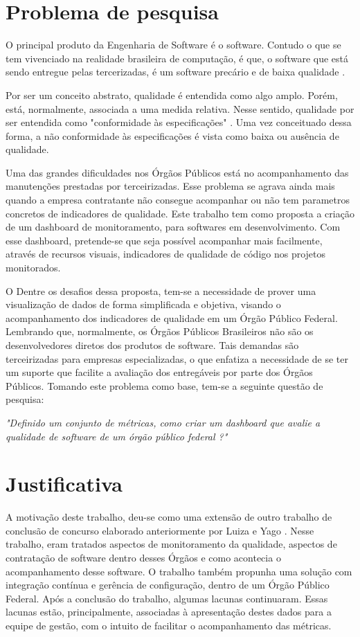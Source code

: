 \section{Problema de pesquisa}
O principal produto da Engenharia de Software é o software. Contudo o que se tem vivenciado na realidade brasileira de computação, é que, o software que está sendo entregue pelas tercerizadas, é um software precário e de baixa qualidade \cite{schnaider_uma_2004}.

 Por ser um conceito abstrato, qualidade é entendida como algo amplo. Porém, está, normalmente, associada a uma medida relativa. Nesse sentido, qualidade por ser entendida como "conformidade às especificações" \cite{crosby}. Uma vez conceituado dessa forma, a não conformidade às especificações é vista como baixa ou ausência de qualidade.

 Uma das grandes dificuldades nos Órgãos Públicos está no acompanhamento das manutenções prestadas por terceirizadas. Esse problema se agrava ainda mais quando a empresa contratante não consegue acompanhar ou não tem parametros concretos de indicadores de qualidade. 
Este trabalho tem como proposta a criação de um dashboard de monitoramento, para softwares em desenvolvimento. Com esse dashboard, pretende-se que seja possível acompanhar mais facilmente, através de recursos visuais, indicadores de qualidade de código nos projetos monitorados.

O Dentre os desafios dessa proposta, tem-se a necessidade de prover uma visualização de dados de forma simplificada e objetiva, visando o acompanhamento dos indicadores de qualidade em um Órgão Público Federal.  Lembrando que, normalmente, os Órgãos Públicos Brasileiros não são os desenvolvedores diretos dos produtos de software. Tais demandas são terceirizadas para empresas especializadas, o que enfatiza a necessidade de se ter um suporte que facilite a avaliação dos entregáveis por parte dos Órgãos Públicos. Tomando este problema como base, tem-se a seguinte questão de pesquisa:
	
	\begin{center}
	\textit{"Definido um conjunto de métricas, como criar um dashboard que avalie a qualidade de software de um órgão público federal ?"}	
	\end{center}

\section{Justificativa}
	A motivação deste trabalho, deu-se como uma extensão de outro trabalho de conclusão de concurso elaborado anteriormente por Luiza e Yago \cite{luiza_yago}. Nesse trabalho, eram tratados aspectos de monitoramento da qualidade, aspectos de contratação de software dentro desses Órgãos e como acontecia o acompanhamento desse software. O trabalho também propunha uma solução com integração contínua e gerência de configuração, dentro de um Órgão Público Federal. Após a conclusão do trabalho, algumas lacunas continuaram. Essas lacunas estão, principalmente, associadas à apresentação destes dados para a equipe de gestão, com o intuito de facilitar o acompanhamento das métricas.

